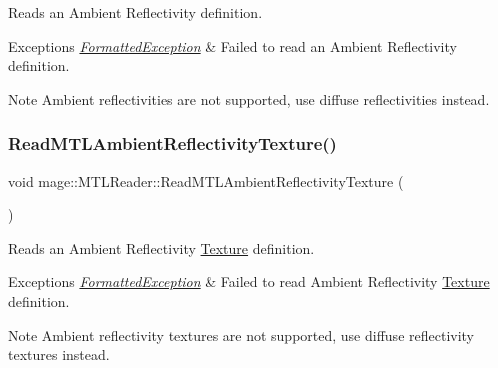 Reads an Ambient Reflectivity definition.


\begin{DoxyExceptions}{Exceptions}
{\em \hyperlink{structmage_1_1_formatted_exception}{Formatted\+Exception}} & Failed to read an Ambient Reflectivity definition. \\
\hline
\end{DoxyExceptions}
\begin{DoxyNote}{Note}
Ambient reflectivities are not supported, use diffuse reflectivities instead. 
\end{DoxyNote}
\hypertarget{classmage_1_1_m_t_l_reader_ae5fa12979b84a5880bf560b43d495305}{}\label{classmage_1_1_m_t_l_reader_ae5fa12979b84a5880bf560b43d495305} 
\subsubsection{\texorpdfstring{Read\+M\+T\+L\+Ambient\+Reflectivity\+Texture()}{ReadMTLAmbientReflectivityTexture()}}
{\footnotesize\ttfamily void mage\+::\+M\+T\+L\+Reader\+::\+Read\+M\+T\+L\+Ambient\+Reflectivity\+Texture (\begin{DoxyParamCaption}{ }\end{DoxyParamCaption})\hspace{0.3cm}{\ttfamily [private]}}

Reads an Ambient Reflectivity \hyperlink{classmage_1_1_texture}{Texture} definition.


\begin{DoxyExceptions}{Exceptions}
{\em \hyperlink{structmage_1_1_formatted_exception}{Formatted\+Exception}} & Failed to read Ambient Reflectivity \hyperlink{classmage_1_1_texture}{Texture} definition. \\
\hline
\end{DoxyExceptions}
\begin{DoxyNote}{Note}
Ambient reflectivity textures are not supported, use diffuse reflectivity textures instead. 
\end{DoxyNote}
\hypertarget{classmage_1_1_m_t_l_reader_acf7aacf933f842d3e14af92d161acd5b}{}\label{classmage_1_1_m_t_l_reader_acf7aacf933f842d3e14af92d161acd5b} 
